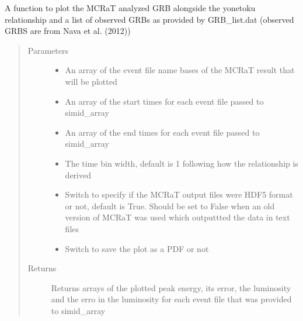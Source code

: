 \documentclass[letterpaper,10pt,english]{sphinxmanual}
\begin{document}
\begin{fulllineitems}
\label{\detokenize{read_process_files:read_process_files.get_yonetoku_rel}}
A function to plot the MCRaT analyzed GRB alongside the yonetoku relationship and a list of observed GRBs as
provided by GRB\_list.dat (observed GRBS are from Nava et al. (2012))
\begin{quote}\begin{description}
\item[{Parameters}] \leavevmode\begin{itemize}
\item {} 
 \textendash{} An array of the event file name bases of the MCRaT result that will be plotted

\item {} 
 \textendash{} An array of the start times for each event file passed to simid\_array

\item {} 
 \textendash{} An array of the end times for each event file passed to simid\_array

\item {} 
 \textendash{} The time bin width, default is 1 following how the relationship is derived

\item {} 
 \textendash{} Switch to specify if the MCRaT output files were HDF5 format or not, default is True. Should be set to
False when an old version of MCRaT was used which outputtted the data in text files

\item {} 
 \textendash{} Switch to save the plot as a PDF or not

\end{itemize}

\item[{Returns}] \leavevmode
Returns arrays of the plotted peak energy, its error, the luminosity and the erro in the luminosity for
each event file that was provided to simid\_array

\end{description}\end{quote}

\end{fulllineitems}
\end{document}
